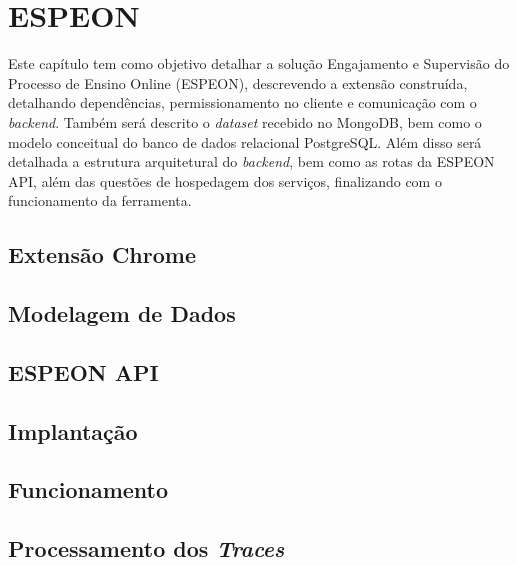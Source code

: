 \chapter{ESPEON}
\label{chp:espeon}
Este capítulo tem como objetivo detalhar a solução Engajamento e Supervisão do Processo de Ensino Online (ESPEON), descrevendo a extensão construída, detalhando dependências, permissionamento no cliente e comunicação com o \textit{backend}. Também será descrito o \textit{dataset} recebido no MongoDB, bem como o modelo conceitual do banco de dados relacional PostgreSQL. Além disso será detalhada a estrutura arquitetural do \textit{backend}, bem como as rotas da ESPEON API, além das questões de hospedagem dos serviços, finalizando com o funcionamento da ferramenta.

\section{Extensão Chrome}\label{sec:espeon_chrome}


\section{Modelagem de Dados}\label{sec:espeon_data}


\section{ESPEON API}\label{sec:espeon_api}


\section{Implantação}\label{sec:espeon_deploy}


\section{Funcionamento}\label{sec:espeon_operation}


\section{Processamento dos \textit{Traces}}\label{sec:traces_proccess}


